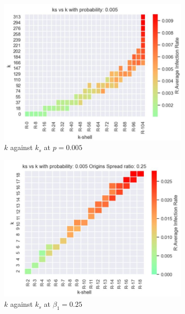 \documentclass[11pt,a4,twocolumn]{article}
\begin{document}
\begin{figure}[h]
\begin{subfigure}{.5\textwidth}
	\centerline{\includegraphics[scale=.4]{ks-k-005.jpg}}
	\caption{$k$ against $k_{s}$ at $p=0.005$}
	\label{fig:fig1}
\end{subfigure}
\begin{subfigure}{.5\textwidth}
	\centerline{\includegraphics[scale=.4]{ks-k-005-25.jpg}}
	\caption{$k$ against $k_{s}$ at ${\beta}_{1} = 0.25$}
	\label{fig:fig2}
\end{subfigure}
\begin{subfigure}{.5\textwidth}

\end{subfigure}
\end{figure}
\end{document}
